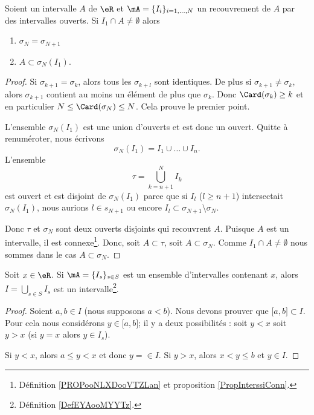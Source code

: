 \begin{lemma}       \label{LEMooJHMTooXwxSAa}
	Soient un intervalle \( A\) de \( \eR\) et \( \mA=\{ I_i \}_{i=1,\ldots, N}\) un recouvrement de \( A\) par des intervalles ouverts. Si \( I_1\cap A\neq \emptyset\) alors
	\begin{enumerate}
		\item
		      \( \sigma_{N}=\sigma_{N+1}\)
		\item
		      \( A\subset \sigma_N(I_1)\).
	\end{enumerate}
\end{lemma}

\begin{proof}
	Si \( \sigma_{k+1}=\sigma_k\), alors tous les \( \sigma_{k+l}\) sont identiques. De plus si \( \sigma_{k+1}\neq \sigma_k\), alors \( \sigma_{k+1}\) contient au moins un élément de plus que \( \sigma_k\). Donc \( \Card(\sigma_k)\geq k\) et en particulier \( N\leq \Card(\sigma_N)\leq N\). Cela prouve le premier point.

	L'ensemble \( \sigma_N(I_1)\) est une union d'ouverts et est donc un ouvert. Quitte à renuméroter, nous écrivons
	\begin{equation}
		\sigma_N(I_1)=I_1\cup \ldots \cup I_n.
	\end{equation}
	L'ensemble
	\begin{equation}
		\tau=\bigcup_{k=n+1}^NI_k
	\end{equation}
	est ouvert et est disjoint de \( \sigma_N(I_1)\) parce que si \( I_l\) (\( l\geq n+1\)) intersectait \( \sigma_N(I_1)\), nous aurions \( l\in s_{N+1}\) ou encore \( I_l\subset \sigma_{N+1}\setminus\sigma_N\).

	Donc \( \tau\) et \( \sigma_N\) sont deux ouverts disjoints qui recouvrent \( A\). Puisque \( A\) est un intervalle, il est connexe\footnote{Définition \ref{PROPooNLXDooVTZLan} et proposition \ref{PropInterssiConn}.}. Donc, soit \( A\subset \tau\), soit \( A\subset \sigma_N\). Comme \( I_1\cap A\neq \emptyset\) nous sommes dans le cas \( A\subset \sigma_N\).
\end{proof}

\begin{lemma}       \label{LEMooGHPTooKgFvGb}
	Soit \( x\in \eR\). Si \( \mA=\{ I_s \}_{s\in S}\) est un ensemble d'intervalles contenant \( x\), alors \( I=\bigcup_{s\in S}I_s\) est un intervalle\footnote{Définition \ref{DefEYAooMYYTz}.}.
\end{lemma}

\begin{proof}
	Soient \( a,b\in I \) (nous supposons \( a<b\)). Nous devons prouver que \( \mathopen[ a , b \mathclose]\subset I\). Pour cela nous considérons \( y\in \mathopen[ a , b \mathclose]\); il y a deux possibilités : soit \( y<x\) soit \( y>x\) (si \( y=x\) alors \( y\in I_s\)).

	Si \( y<x\), alors \( a\leq y<x\) et donc \( y=\in I\). Si \( y>x\), alors \( x<y\leq b\) et \( y\in I\).
\end{proof}

